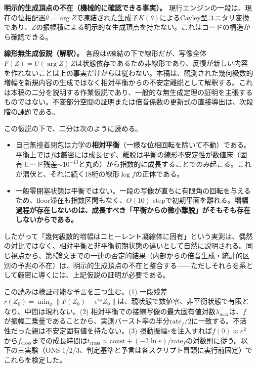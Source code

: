 \documentclass[
  a4paper,
]{ltjsarticle}
\providecommand{\tightlist}{%
  \setlength{\itemsep}{0pt}\setlength{\parskip}{0pt}}
\begin{document}
\textbf{明示的生成頂点の不在（機械的に確認できる事実）。}
現行エンジンの一段は、現在の位相配置\(\theta=\arg Z\)で凍結された生成子\(K(\theta)\)によるCayley型ユニタリ変換であり、\(Z\)の振幅積による明示的な生成頂点を持たない。これはコードの構造から確認できる。

\textbf{線形無生成仮説（解釈）。}
各段は\(\theta\)凍結の下で線形だが、写像全体\(F(Z)=U(\arg Z)\,Z\)は状態依存であるため非線形であり、反復が新しい内容を作れないことは上の事実だけからは従わない。本稿は、観測された幾何級数的増幅を新規内容の生成ではなく相対平衡からの不安定離脱として解釈する。これは本稿の二分を説明する作業仮説であり、一般的な無生成定理の証明を主張するものではない。不変部分空間の証明または倍音係数の更新式の直接導出は、次段階の課題である。

この仮説の下で、二分は次のように読める。

\begin{itemize}
\tightlist
\item
  自己無撞着閉包は力学の\textbf{相対平衡}（一様な位相回転を除いて不動）である。平衡上では\(f\)は厳密には成長せず、離脱は平衡の線形不安定性が数値床（固有モード残差\(\sim10^{-13}\)と丸め）から指数的に成長することでのみ起こる。これが潜伏と、それに続く18桁の線形\(\log f\)の正体である。
\item
  一般零閉塞状態は平衡ではない。一段の写像が直ちに有限角の回転を与えるため、floor滞在も指数区間もなく、\(O(10)\)
  stepで初期平面を離れる。\textbf{増幅過程が存在しないのは、成長すべき「平衡からの微小離脱」がそもそも存在しないからである。}
\end{itemize}

したがって「幾何級数的増幅はコヒーレント凝縮体に固有」という実測は、偶然の対比ではなく、相対平衡と非平衡初期状態の違いとして自然に説明される。同じ視点から、第8論文までの一連の否定的結果（内部からの倍音生成・統計的区別の予兆の不在）は、明示的生成頂点の不在と整合する------ただしそれらを系として厳密に導くには、上記仮説の証明が必要である。

この読みは検証可能な予言を三つ生む。(1)
一段残差\(r(Z_0)=\min_\phi\lVert F(Z_0)-e^{i\phi}Z_0\rVert\)は、親状態で数値零、非平衡状態で有限となり、中間は現れない。(2)
相対平衡での接線写像の最大固有値対数\(\lambda_{\max}\)は、\(f\)が振幅二乗量であることから、実測バースト率の半分\(\text{rate}_f/2\)に一致する。不活性だった親は不安定固有値を持たない。(3)
摂動振幅\(\varepsilon\)を注入すれば\(f(0)\approx\varepsilon^2\)から\(f_{\mathrm{cross}}\)までの成長時間は\(t_{\mathrm{cross}}\approx\text{const}+(-2\ln\varepsilon)/\text{rate}_f\)の対数則に従う。以下の三実験（ONS-1/2/3、判定基準と予言は各スクリプト冒頭に実行前固定）でこれらを検定した。
\end{document}

